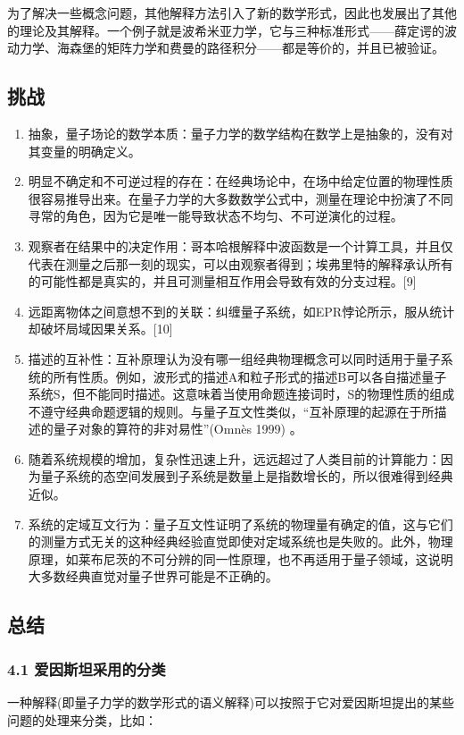 为了解决一些概念问题，其他解释方法引入了新的数学形式，因此也发展出了其他的理论及其解释。一个例子就是波希米亚力学，它与三种标准形式——薛定谔的波动力学、海森堡的矩阵力学和费曼的路径积分——都是等价的，并且已被验证。

\subsection{挑战}

\begin{enumerate}
\item 抽象，量子场论的数学本质：量子力学的数学结构在数学上是抽象的，没有对其变量的明确定义。
\item 明显不确定和不可逆过程的存在：在经典场论中，在场中给定位置的物理性质很容易推导出来。在量子力学的大多数数学公式中，测量在理论中扮演了不同寻常的角色，因为它是唯一能导致状态不均匀、不可逆演化的过程。
\item 观察者在结果中的决定作用：哥本哈根解释中波函数是一个计算工具，并且仅代表在测量之后那一刻的现实，可以由观察者得到；埃弗里特的解释承认所有的可能性都是真实的，并且可测量相互作用会导致有效的分支过程。[9]
\item 远距离物体之间意想不到的关联：纠缠量子系统，如EPR悖论所示，服从统计却破坏局域因果关系。[10]
\item 描述的互补性：互补原理认为没有哪一组经典物理概念可以同时适用于量子系统的所有性质。例如，波形式的描述A和粒子形式的描述B可以各自描述量子系统S，但不能同时描述。这意味着当使用命题连接词时，S的物理性质的组成不遵守经典命题逻辑的规则。与量子互文性类似，“互补原理的起源在于所描述的量子对象的算符的非对易性”(Omnès 1999) 。
\item 随着系统规模的增加，复杂性迅速上升，远远超过了人类目前的计算能力：因为量子系统的态空间发展到子系统是数量上是指数增长的，所以很难得到经典近似。
\item 系统的定域互文行为：量子互文性证明了系统的物理量有确定的值，这与它们的测量方式无关的这种经典经验直觉即使对定域系统也是失败的。此外，物理原理，如莱布尼茨的不可分辨的同一性原理，也不再适用于量子领域，这说明大多数经典直觉对量子世界可能是不正确的。
\end{enumerate}

\subsection{总结}

\subsubsection{4.1 爱因斯坦采用的分类}
一种解释(即量子力学的数学形式的语义解释)可以按照于它对爱因斯坦提出的某些问题的处理来分类，比如：

